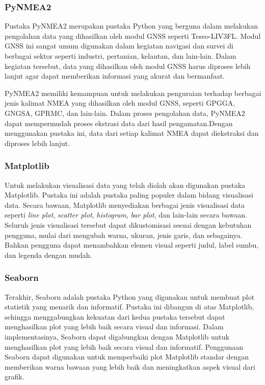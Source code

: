 \subsubsection{PyNMEA2}
Pustaka PyNMEA2 merupakan pustaka Python yang berguna dalam melakukan pengolahan data yang dihasilkan oleh modul GNSS seperti Teseo-LIV3FL. Modul GNSS ini sangat umum digunakan dalam kegiatan navigasi dan survei di berbagai sektor seperti industri, pertanian, kelautan, dan lain-lain. Dalam kegiatan tersebut, data yang dihasilkan oleh modul GNSS harus diproses lebih lanjut agar dapat memberikan informasi yang akurat dan bermanfaat.

PyNMEA2 memiliki kemampuan untuk melakukan penguraian terhadap berbagai jenis kalimat NMEA yang dihasilkan oleh modul GNSS, seperti GPGGA, GNGSA, GPRMC, dan lain-lain. Dalam proses pengolahan data, PyNMEA2 dapat mempermudah proses ekstrasi data dari hasil pengamatan.Dengan menggunakan pustaka ini, data dari setiap kalimat NMEA dapat diekstraksi dan diproses lebih lanjut.

\subsubsection{Matplotlib}
Untuk melakukan visualisasi data yang telah diolah akan digunakan pustaka Matplotlib. Pustaka ini adalah pustaka paling populer dalam bidang visualisasi data. Secara bawaan, Matplotlib menyediakan berbagai jenis visualisasi data seperti \textit{line plot}, \textit{scatter plot}, \textit{histogram}, \textit{bar plot}, dan lain-lain secara bawaan. Seluruh jenis visualisasi tersebut dapat dikustomisasi sesuai dengan kebutuhan pengguna, mulai dari mengubah warna, ukuran, jenis garis, dan sebagainya. Bahkan pengguna dapat menambahkan elemen visual seperti judul, label sumbu, dan legenda dengan mudah.

\subsubsection{Seaborn}
Terakhir, Seaborn adalah pustaka Python yang digunakan untuk membuat plot statistik yang menarik dan informatif. Pustaka ini dibangun di atas Matplotlib, sehingga menggabungkan kekuatan dari kedua pustaka tersebut dapat menghasilkan plot yang lebih baik secara visual dan informasi. Dalam implementasinya, Seaborn dapat digabungkan dengan Matplotlib untuk menghasilkan plot yang lebih baik secara visual dan informatif. Penggunaan Seaborn dapat digunakan untuk memperbaiki plot Matplotlib standar dengan memberikan warna bawaan yang lebih baik dan meningkatkan aspek visual dari grafik.

